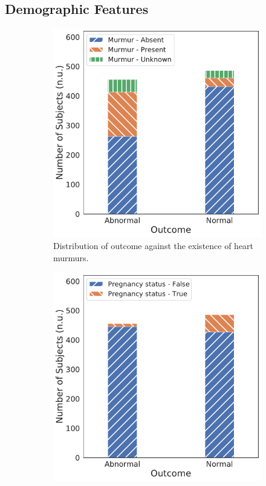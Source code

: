 \subsection{Demographic Features}
\label{subsec:demo_feat}

\begin{figure}[!htp]
\centering
\begin{subfigure}[b]{0.49\linewidth}
    \centering
    \includegraphics[width=\textwidth]{images/outcome_murmur_corr.pdf}
    \caption[]
    {Distribution of outcome against the existence of heart murmurs.}
    \label{fig:outcome_murmur_corr}
\end{subfigure}
\hfill
\begin{subfigure}[b]{0.49\linewidth}
    \centering
    \includegraphics[width=\textwidth]{images/outcome_pregnancy_status_corr.pdf}

\end{subfigure}
\end{figure}
